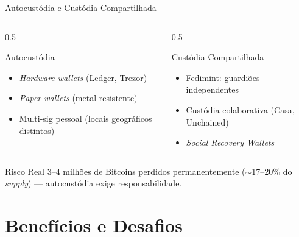 \documentclass{libs/ufc_format}
\begin{document}
\begin{frame}{Autocustódia e Custódia Compartilhada}
    \begin{columns}
        \begin{column}{0.5\textwidth}
            \begin{block}{Autocustódia}
                \begin{itemize}
                    \item \textit{Hardware wallets} (Ledger, Trezor)
                    \item \textit{Paper wallets} (metal resistente)
                    \item Multi-sig pessoal (locais geográficos distintos)
                \end{itemize}
            \end{block}
        \end{column}
        \begin{column}{0.5\textwidth}
            \begin{block}{Custódia Compartilhada}
                \begin{itemize}
                    \item Fedimint: guardiões independentes
                    \item Custódia colaborativa (Casa, Unchained)
                    \item \textit{Social Recovery Wallets}
                \end{itemize}
            \end{block}
        \end{column}
    \end{columns}

    \vspace{0.3cm}

    \begin{alertblock}{Risco Real}
        3--4 milhões de Bitcoins perdidos permanentemente ($\sim$17--20\% do \textit{supply}) --- autocustódia exige responsabilidade.
    \end{alertblock}
\end{frame}

\section{Benefícios e Desafios}
\end{document}
